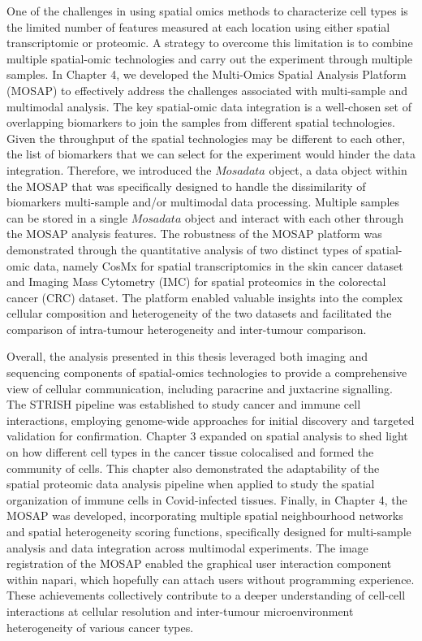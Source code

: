 One of the challenges in using spatial omics methods to characterize cell types is the limited number of features measured at each location using either spatial transcriptomic or proteomic. A strategy to overcome this limitation is to combine multiple spatial-omic technologies and carry out the experiment through multiple samples. In Chapter 4, we developed the Multi-Omics Spatial Analysis Platform (MOSAP) to effectively address the challenges associated with multi-sample and multimodal analysis. The key spatial-omic data integration is a well-chosen set of overlapping biomarkers to join the samples from different spatial technologies. Given the throughput of the spatial technologies may be different to each other, the list of biomarkers that we can select for the experiment would hinder the data integration. Therefore, we introduced the $Mosadata$ object, a data object within the MOSAP that was specifically designed to handle the dissimilarity of biomarkers multi-sample and/or multimodal data processing. Multiple samples can be stored in a single $Mosadata$ object and interact with each other through the MOSAP analysis features. The robustness of the MOSAP platform was demonstrated through the quantitative analysis of two distinct types of spatial-omic data, namely CosMx for spatial transcriptomics in the skin cancer dataset and Imaging Mass Cytometry (IMC) for spatial proteomics in the colorectal cancer (CRC) dataset. The platform enabled valuable insights into the complex cellular composition and heterogeneity of the two datasets and facilitated the comparison of intra-tumour heterogeneity and inter-tumour comparison.  

Overall, the analysis presented in this thesis leveraged both imaging and sequencing components of spatial-omics technologies to provide a comprehensive view of cellular communication, including paracrine and juxtacrine signalling. The STRISH pipeline was established to study cancer and immune cell interactions, employing genome-wide approaches for initial discovery and targeted validation for confirmation. Chapter 3 expanded on spatial analysis to shed light on how different cell types in the cancer tissue colocalised and formed the community of cells. This chapter also demonstrated the adaptability of the spatial proteomic data analysis pipeline when applied to study the spatial organization of immune cells in Covid-infected tissues. Finally, in Chapter 4, the MOSAP was developed, incorporating multiple spatial neighbourhood networks and spatial heterogeneity scoring functions, specifically designed for multi-sample analysis and data integration across multimodal experiments. The image registration of the MOSAP enabled the graphical user interaction component within napari, which hopefully can attach users without programming experience. These achievements collectively contribute to a deeper understanding of cell-cell interactions at cellular resolution and inter-tumour microenvironment heterogeneity of various cancer types. 
